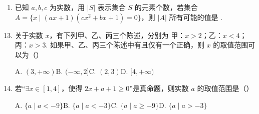\documentclass[a4paper,11pt]{article}
\begin{document}
\begin{enumerate}
\fi

\item 已知 $a,b,c$ 为实数，用 $|S|$ 表示集合 $S$ 的元素个数，若集合 $A=\{x\mid (ax+1)(cx^2+bx+1)=0\}$，则 $|A|$ 所有可能的值是 \blankline[5em].


\end{enumerate}


\begin{enumerate}
\setcounter{enumi}{12}

\item 关于实数 $x$，有下列甲、乙、丙三个陈述，分别为 甲：$x>2$；乙：$x<4$；丙：$x>3$. 如果甲、乙、丙三个陈述中有且仅有一个正确，则 $x$ 的取值范围可以为\mbox{（\quad）}

\keepwithprev
A. $(3,+\infty)$\qquad B. $(-\infty,2]$\qquad C. $(2,3)$\qquad D. $[4,+\infty)$


\ifanswer
\solbegin
{}
\solend

\fi

\item 若“$\exists x\in[1,4]$，使得 $2x+a+1\geqslant 0$”是真命题，则实数 $a$ 的取值范围是\mbox{（\quad）}

\keepwithprev
A. $\{a\mid a<-9\}$\qquad B. $\{a\mid a<-3\}$\qquad C. $\{a\mid a\geqslant -9\}$\qquad D. $\{a\mid a>-3\}$


\ifanswer
\solbegin
{}
\solend


\end{enumerate}
\end{document}
